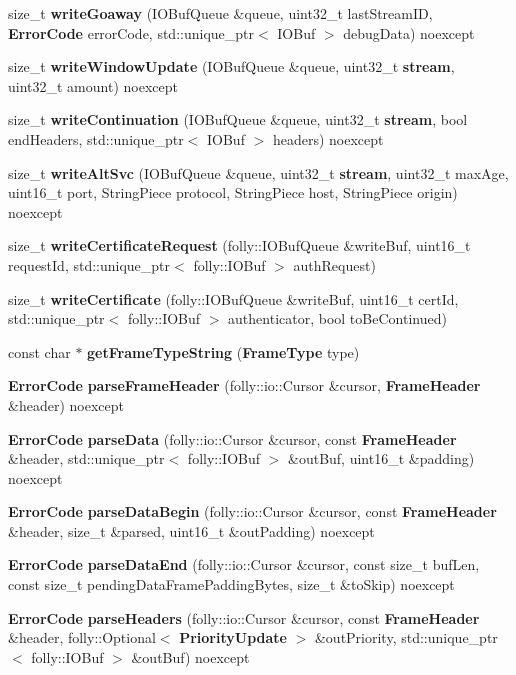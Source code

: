 \begin{DoxyCompactItemize}
\item 
size\+\_\+t {\bf write\+Goaway} (I\+O\+Buf\+Queue \&queue, uint32\+\_\+t last\+Stream\+ID, {\bf Error\+Code} error\+Code, std\+::unique\+\_\+ptr$<$ I\+O\+Buf $>$ debug\+Data) noexcept
\item 
size\+\_\+t {\bf write\+Window\+Update} (I\+O\+Buf\+Queue \&queue, uint32\+\_\+t {\bf stream}, uint32\+\_\+t amount) noexcept
\item 
size\+\_\+t {\bf write\+Continuation} (I\+O\+Buf\+Queue \&queue, uint32\+\_\+t {\bf stream}, bool end\+Headers, std\+::unique\+\_\+ptr$<$ I\+O\+Buf $>$ headers) noexcept
\item 
size\+\_\+t {\bf write\+Alt\+Svc} (I\+O\+Buf\+Queue \&queue, uint32\+\_\+t {\bf stream}, uint32\+\_\+t max\+Age, uint16\+\_\+t port, String\+Piece protocol, String\+Piece host, String\+Piece origin) noexcept
\item 
size\+\_\+t {\bf write\+Certificate\+Request} (folly\+::\+I\+O\+Buf\+Queue \&write\+Buf, uint16\+\_\+t request\+Id, std\+::unique\+\_\+ptr$<$ folly\+::\+I\+O\+Buf $>$ auth\+Request)
\item 
size\+\_\+t {\bf write\+Certificate} (folly\+::\+I\+O\+Buf\+Queue \&write\+Buf, uint16\+\_\+t cert\+Id, std\+::unique\+\_\+ptr$<$ folly\+::\+I\+O\+Buf $>$ authenticator, bool to\+Be\+Continued)
\item 
const char $\ast$ {\bf get\+Frame\+Type\+String} ({\bf Frame\+Type} type)
\item 
{\bf Error\+Code} {\bf parse\+Frame\+Header} (folly\+::io\+::\+Cursor \&cursor, {\bf Frame\+Header} \&header) noexcept
\item 
{\bf Error\+Code} {\bf parse\+Data} (folly\+::io\+::\+Cursor \&cursor, const {\bf Frame\+Header} \&header, std\+::unique\+\_\+ptr$<$ folly\+::\+I\+O\+Buf $>$ \&out\+Buf, uint16\+\_\+t \&padding) noexcept
\item 
{\bf Error\+Code} {\bf parse\+Data\+Begin} (folly\+::io\+::\+Cursor \&cursor, const {\bf Frame\+Header} \&header, size\+\_\+t \&parsed, uint16\+\_\+t \&out\+Padding) noexcept
\item 
{\bf Error\+Code} {\bf parse\+Data\+End} (folly\+::io\+::\+Cursor \&cursor, const size\+\_\+t buf\+Len, const size\+\_\+t pending\+Data\+Frame\+Padding\+Bytes, size\+\_\+t \&to\+Skip) noexcept
\item 
{\bf Error\+Code} {\bf parse\+Headers} (folly\+::io\+::\+Cursor \&cursor, const {\bf Frame\+Header} \&header, folly\+::\+Optional$<$ {\bf Priority\+Update} $>$ \&out\+Priority, std\+::unique\+\_\+ptr$<$ folly\+::\+I\+O\+Buf $>$ \&out\+Buf) noexcept

\end{DoxyCompactItemize}
